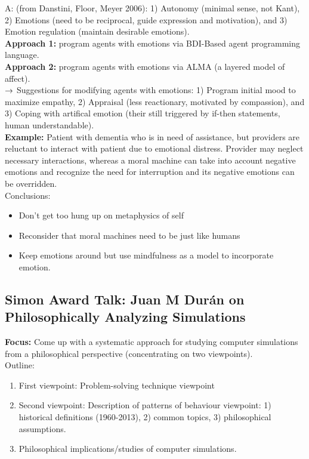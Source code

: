 A: (from Danstini, Floor, Meyer 2006): 1) Autonomy (minimal sense, not Kant), 2) Emotions (need to be reciprocal, guide expression and motivation), and 3) Emotion regulation (maintain desirable emotions). \\

{\bf Approach 1:} program agents with emotions via BDI-Based agent programming language. \\
{\bf Approach 2:} program agents with emotions via ALMA (a layered model of affect). \\

$\rightarrow$ Suggestions for modifying agents with emotions: 1) Program initial mood to maximize empathy, 2) Appraisal (less reactionary, motivated by compassion), and 3) Coping with artifical emotion (their still triggered by if-then statements, human understandable). \\

{\bf Example:} Patient with dementia who is in need of assistance, but providers are reluctant to interact with patient due to emotional distress. Provider may neglect necessary interactions, whereas a moral machine can take into account negative emotions and recognize the need for interruption and its negative emotions can be overridden. \\

Conclusions:
\begin{itemize}
\item Don't get too hung up on metaphysics of self
\item Reconsider that moral machines need to be just like humans
\item Keep emotions around but use mindfulness as a model to incorporate emotion.
\end{itemize}

\spacerule
\subsection{Simon Award Talk: Juan M Dur{\' a}n on Philosophically Analyzing Simulations}

{\bf Focus:} Come up with a systematic approach for studying computer simulations from a philosophical perspective (concentrating on two viewpoints). \\

Outline:
\begin{enumerate}
	\item First viewpoint: Problem-solving technique viewpoint
	\item Second viewpoint: Description of patterns of behaviour viewpoint: 1) historical definitions (1960-2013), 2) common topics, 3) philosophical assumptions.
	\item Philosophical implications/studies of computer simulations.
\end{enumerate}



